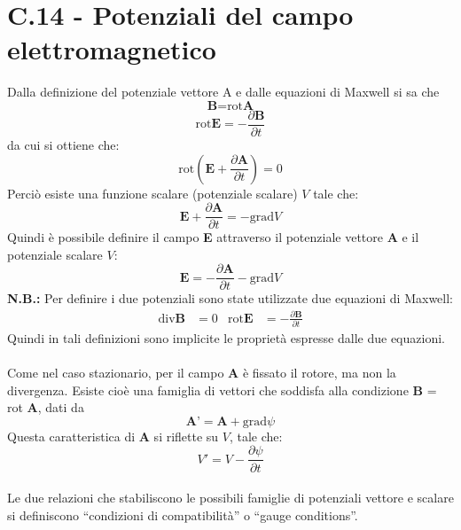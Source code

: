 \documentclass{article}
\begin{document}
\section*{C.14 - Potenziali del campo elettromagnetico}
Dalla definizione del potenziale vettore A e dalle equazioni di Maxwell si sa che
\begin{equation}
\textbf{B}=\text{rot}\textbf{A}
\nonumber
\end{equation}
\begin{equation}
\text{rot}\textbf{E}=-\frac{\partial \textbf{B}}{\partial t}
\nonumber
\end{equation}
da cui si ottiene che:
\begin{equation}
\text{rot}\left(\textbf{E}+\frac{\partial \textbf{A}}{\partial t}\right)=0
\nonumber
\end{equation}
Perciò esiste una funzione scalare (potenziale scalare) $V$ tale che:
\begin{equation}
\textbf{E}+\frac{\partial \textbf{A}}{\partial t}=-\text{grad}V
\nonumber
\end{equation}
Quindi è possibile definire il campo \textbf{E} attraverso il
potenziale vettore \textbf{A} e il potenziale scalare $V$:
\begin{equation}
\textbf{E}=-\frac{\partial \textbf{A}}{\partial t}-\text{grad}V
\nonumber
\end{equation}
\textbf{N.B.:} Per definire i due potenziali sono state utilizzate
due equazioni di Maxwell:
\begin{align*}
\text{div}\textbf{B}&=0  &  \text{rot}\textbf{E}&=-\frac{\partial\textbf{B}}{\partial t}
\nonumber
\end{align*}
Quindi in tali definizioni sono implicite le proprietà
espresse dalle due equazioni.\\
\\
Come nel caso stazionario, per il campo \textbf{A} è fissato il rotore, ma non la divergenza. Esiste cioè una famiglia di vettori che soddisfa alla condizione \textbf{B} = rot \textbf{A}, dati da
\begin{equation}
\textbf{A'}=\textbf{A}+\text{grad}\psi
\nonumber
\end{equation}
Questa caratteristica di \textbf{A} si riflette su $V$, tale che:
\begin{equation}
V'=V-\frac{\partial \psi}{\partial t}
\nonumber
\end{equation}
\\
Le due relazioni che stabiliscono le possibili famiglie di potenziali vettore e scalare si definiscono “condizioni di compatibilità” o “gauge conditions”.
\end{document}
